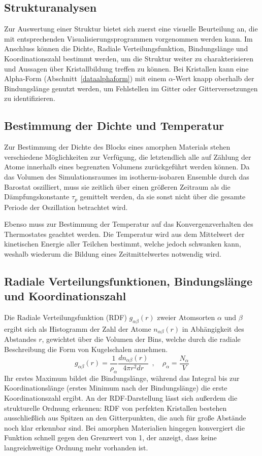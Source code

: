 \subsection{Strukturanalysen}

Zur Auswertung einer Struktur bietet sich zuerst eine visuelle Beurteilung an, die mit entsprechenden Visualisierungsprogrammen vorgenommen werden kann.
Im Anschluss können die Dichte, Radiale Verteilungsfunktion, Bindungslänge und Koordinationszahl bestimmt werden, um die Struktur weiter zu charakterisieren und Aussagen über Kristallbildung treffen zu können.
Bei Kristallen kann eine Alpha-Form (Abschnitt~\ref{dataalphaform}) mit einem $\alpha$-Wert knapp oberhalb der Bindungslänge genutzt werden, um Fehlstellen im Gitter oder Gitterversetzungen zu identifizieren.

\subsection{Bestimmung der Dichte und Temperatur}

Zur Bestimmung der Dichte des Blocks eines amorphen Materials stehen verschiedene Möglichkeiten zur Verfügung, die letztendlich alle auf Zählung der Atome innerhalb eines begrenzten Volumens zurückgeführt werden können.
Da das Volumen des Simulationsraumes im isotherm-isobaren Ensemble durch das Barostat oszilliert, muss sie zeitlich über einen größeren Zeitraum als die Dämpfungskonstante $\tau_p$ gemittelt werden, da sie sonst nicht über die gesamte Periode der Oszillation betrachtet wird.

Ebenso muss zur Bestimmung der Temperatur auf das Konvergenzverhalten des Thermostates geachtet werden.
Die Temperatur wird aus dem Mittelwert der kinetischen Energie aller Teilchen bestimmt, welche jedoch schwanken kann, weshalb wiederum die Bildung eines Zeitmittelwertes notwendig wird.

\subsection{Radiale Verteilungsfunktionen, Bindungslänge und Koordinationszahl}

Die Radiale Verteilungsfunktion (RDF) $g_{\alpha\beta}(r)$ zweier Atomsorten $\alpha$ und $\beta$ ergibt sich als Histogramm der Zahl der Atome $n_{\alpha\beta}(r)$ in Abhängigkeit des Abstandes $r$, gewichtet über die Volumen der Bins, welche durch die radiale Beschreibung die Form von Kugelschalen annehmen.
\begin{equation}
  g_{\alpha\beta}(r) = \frac{1}{\rho_\alpha} \frac{d n_{\alpha\beta}(r)}{4 \pi r^2 dr} ~~,\quad \rho_\alpha = \frac{N_\alpha}{V}
\end{equation}
Ihr erstes Maximum bildet die Bindungslänge, während das Integral bis zur Koordinationslänge (erstes Minimum nach der Bindungslänge) die erste Koordinationszahl ergibt.
An der RDF-Darstellung lässt sich außerdem die strukturelle Ordnung erkennen:
RDF von perfekten Kristallen bestehen ausschließlich aus Spitzen an den Gitterpunkten, die auch für große Abstände noch klar erkennbar sind.
Bei amorphen Materialien hingegen konvergiert die Funktion schnell gegen den Grenzwert von 1, der anzeigt, dass keine langreichweitige Ordnung mehr vorhanden ist.

